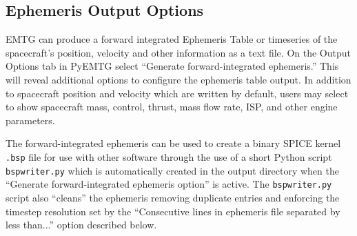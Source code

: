 \subsection{Ephemeris Output Options}
\label{sec:output_ephemeris_options}

\ac{EMTG} can produce a forward integrated Ephemeris Table or timeseries of the spacecraft's position, velocity and other information as a text file. On the Output Options tab in PyEMTG select ``Generate forward-integrated ephemeris.'' This will reveal additional options to configure the ephemeris table output. In addition to spacecraft position and velocity which are written by default, users may select to show spacecraft mass, control, thrust, mass flow rate, ISP, and other engine parameters. 

\noindent The forward-integrated ephemeris can be used to create a binary \ac{SPICE} kernel \verb|.bsp| file for use with other software through the use of a short Python script \verb|bspwriter.py| which is automatically created in the output directory when the ``Generate forward-integrated ephemeris option'' is active. The \verb|bspwriter.py| script also ``cleans'' the ephemeris removing duplicate entries and enforcing the timestep resolution set by the ``Consecutive lines in ephemeris file separated by less than...'' option described below.

